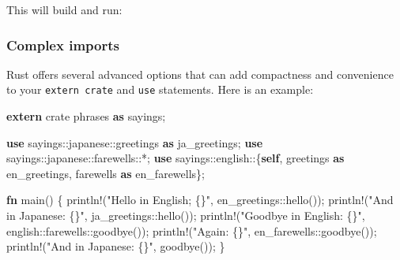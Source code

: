 \documentclass[a4paper,]{book}
\newenvironment{Shaded}{\begin{snugshade}}{\end{snugshade}}
\newcommand{\KeywordTok}[1]{\textcolor[rgb]{0.13,0.29,0.53}{\textbf{{#1}}}}
\newcommand{\StringTok}[1]{\textcolor[rgb]{0.31,0.60,0.02}{{#1}}}
\newcommand{\OtherTok}[1]{\textcolor[rgb]{0.56,0.35,0.01}{{#1}}}
\newcommand{\NormalTok}[1]{{#1}}
\begin{document}
This will build and run:

\begin{Shaded}
\end{Shaded}

\subsubsection{Complex imports}\label{complex-imports}

Rust offers several advanced options that can add compactness and
convenience to your \texttt{extern\ crate} and \texttt{use} statements.
Here is an example:

\begin{Shaded}
\begin{Highlighting}[]
\KeywordTok{extern} \NormalTok{crate phrases }\KeywordTok{as} \NormalTok{sayings;}

\KeywordTok{use} \NormalTok{sayings::japanese::greetings }\KeywordTok{as} \NormalTok{ja_greetings;}
\KeywordTok{use} \NormalTok{sayings::japanese::farewells::*;}
\KeywordTok{use} \NormalTok{sayings::english::\{}\KeywordTok{self}\NormalTok{, greetings }\KeywordTok{as} \NormalTok{en_greetings, farewells }\KeywordTok{as} \NormalTok{en_farewells\};}

\KeywordTok{fn} \NormalTok{main() \{}
    \OtherTok{println!}\NormalTok{(}\StringTok{"Hello in English; \{\}"}\NormalTok{, en_greetings::hello());}
    \OtherTok{println!}\NormalTok{(}\StringTok{"And in Japanese: \{\}"}\NormalTok{, ja_greetings::hello());}
    \OtherTok{println!}\NormalTok{(}\StringTok{"Goodbye in English: \{\}"}\NormalTok{, english::farewells::goodbye());}
    \OtherTok{println!}\NormalTok{(}\StringTok{"Again: \{\}"}\NormalTok{, en_farewells::goodbye());}
    \OtherTok{println!}\NormalTok{(}\StringTok{"And in Japanese: \{\}"}\NormalTok{, goodbye());}
\NormalTok{\}}
\end{Highlighting}
\end{Shaded}
\end{document}
